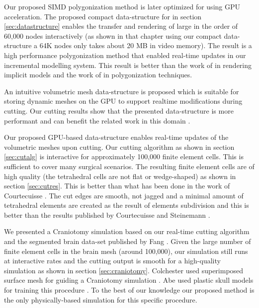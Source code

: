 Our proposed SIMD polygonization method is later optimized for using GPU acceleration. The 
proposed compact data-structure for \blob in section \ref{sec:datastructure} enables the transfer and 
rendering of large \blob in the order of 60,000 nodes interactively (as shown in that chapter using our 
compact data-structure a 64K nodes \blob only takes about 20 MB in video memory).  The result is a 
high performance polygonization method that enabled real-time updates in our incremental modelling 
system. This result is better than the work of \cite{Knoll2007, singh2010real} 
in rendering implicit models and the work of \cite{Yang2010, chochlik2012gpu} 
in polygonization techniques.

 
An intuitive volumetric mesh data-structure is proposed which is suitable for storing dynamic meshes on 
the GPU to support realtime modifications during cutting. Our cutting results show that the presented 
data-structure is more performant and can benefit the related work in this domain 
\cite{Wu2004a, Wu2005, Courtecuisse2010}.

Our proposed GPU-based data-structure enables real-time updates of the volumetric meshes upon 
cutting. Our cutting algorithm as shown in section \ref{sec:cutalg} is interactive for approximately 100,000 finite 
element cells. This is sufficient to cover many surgical scenarios. The resulting finite element 
cells are of high quality (the tetrahedral cells are not flat or wedge-shaped) as shown in section \ref{sec:cutres}. 
This is better than what has been done in the work of Courtecuisse \etal \cite{Courtecuisse2010}.
The cut edges are smooth, not jagged and a minimal amount of tetrahedral elements are 
created as the result of elements subdivision and this is better than the results published by Courtecuisse
\etal and Steinemann \etal \cite{Courtecuisse2010, Steinemann}. 


We presented a Craniotomy simulation based on our real-time cutting algorithm and the segmented 
brain data-set published by Fang \etal \cite{fang2010mesh}. 
Given the large number of finite element cells in the brain mesh (around 100,000), our 
simulation still runs at interactive rates and the cutting output is smooth for a high-quality simulation 
as shown in section \ref{sec:craniotomy}. Colchester \etal used superimposed surface mesh for 
guiding a Craniotomy simulation \cite{Colchester1994}. Abe \etal used plastic skull models for 
training this procedure \cite{Abe1998}. To the best of our knowledge our proposed method is the only 
physically-based simulation for this specific procedure. 




